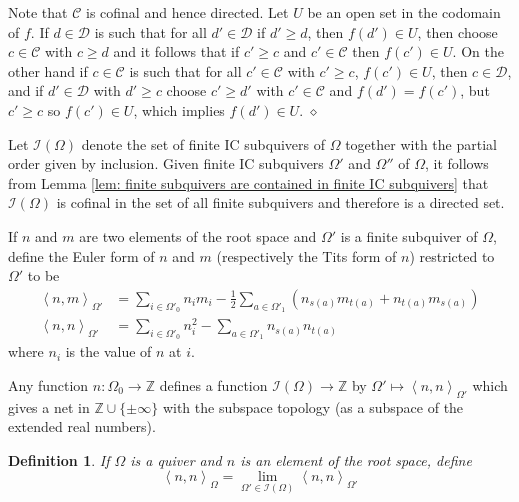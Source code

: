 \documentclass{article}
\newcommand{\bracket}[1]{\left \langle #1 \right\rangle}
\newcommand{\parens}[1]{\left( #1 \right)}
\newtheorem{definition}{Definition}
\newenvironment{proof}{\vspace*{2ex}\noindent {\em Proof:}
}{\hfill $\diamond$ \\[2ex]}
\begin{document}
\begin{proof}
Note that $\mathcal{C}$ is cofinal and hence directed. Let $U$ be an open set in the codomain of $f$. If $d \in \mathcal{D}$ is such that for all $d' \in \mathcal{D}$ if $d' \geq d$, then  $f(d') \in U$, then choose $c \in \mathcal{C}$ with $c \geq d$ and it follows that if $c' \geq c$ and $c' \in \mathcal{C}$ then $f(c') \in U$.  On the other hand if $c \in \mathcal{C}$ is such that for all $c' \in \mathcal{C}$ with $c' \geq c$, $f(c') \in U$, then $c \in \mathcal{D}$, and if $d' \in \mathcal{D}$ with $d' \geq c$ choose $c' \geq d'$ with $c' \in \mathcal{C}$ and $f(d')=f(c')$, but $c' \geq c$ so $f(c') \in U$, which implies  $f(d') \in U$.
\end{proof}

Let $\mathcal{I}(\Omega)$ denote the set of finite IC subquivers of $\Omega$ together with the partial order given by inclusion. Given finite IC subquivers $\Omega'$ and $\Omega''$ of $\Omega$, it follows from Lemma \ref{lem: finite subquivers are contained in finite IC subquivers} that $\mathcal{I}(\Omega)$ is cofinal in the set of all finite subquivers and therefore is a directed set.

If $n$ and $m$ are two elements of the root space and  $\Omega'$ is a finite subquiver of $\Omega$, define the Euler form of $n$ and $m$ (respectively the Tits form of $n$) restricted to $\Omega'$ to be
\begin{align} \label{eq: tits form}
\bracket{n,m}_{\Omega'} &= \sum_{ i \in \Omega'_0} n_im_i - \frac{1}{2} \sum_{a \in \Omega'_1}\parens{ n_{s(a)}m_{t(a)} + n_{t(a)}m_{s(a)}}\\ \bracket{n,n}_{\Omega'} &= \sum_{ i \in \Omega'_0} n_i^2 -  \sum_{a \in \Omega'_1}n_{s(a)}n_{t(a)}  \nonumber
\end{align} 
where $n_i$ is the value of $n$ at $i$.  

 Any function $n : \Omega_0 \to \mathbb{Z}$ defines a function $\mathcal{I}(\Omega) \to \mathbb{Z}$ by $\Omega' \mapsto \bracket{n, n}_{\Omega'}$ which gives  a net in $\mathbb{Z} \cup \{ \pm \infty\}$ with the subspace topology (as a subspace of the extended real numbers).   

\begin{definition}\label{def: tits form limit}
  If $\Omega$ is a quiver and $n$ is an element of the root space, define
\begin{equation*}
\bracket{n,n}_{\Omega} = \lim_{\Omega' \in \mathcal{I}(\Omega)} \bracket{n,n}_{\Omega'}
\end{equation*}
\end{definition}
\end{document}
